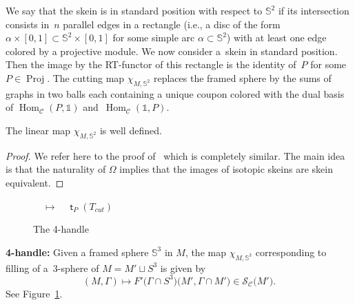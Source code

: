 \documentclass[pdftex]{sigma}
\numberwithin{equation}{section}
\newcommand{\Proj}{\operatorname{Proj}}
\numberwithin{theorem}{section}
\numberwithin{proposition}{section}
\numberwithin{definition}{section}
\numberwithin{lemma}{section}
\numberwithin{corollary}{section}
\numberwithin{remark}{section}
\numberwithin{example}{section}
\newcommand{\cat}{\mathcal{C}}
\newcommand{\Hom}{\operatorname{Hom}}
\newcommand{\unit}{\ensuremath{\mathds{1}}}
\newcommand{\mt}{{\operatorname{\mathsf{t}}}}
\newcommand{\TSkein}{{\mathscr{S}}}
\newcommand{\Sp}{\mathbb{S}}
\begin{document}
We say that the skein is in standard position with respect to $\Sp^2$ if its
intersection consists in~$n$ parallel edges in a rectangle \big(i.e., a disc of the form $\alpha\times [0,1]\subset \Sp^2\times [0,1]$ for some simple arc $\alpha\subset \Sp^2$\big) with at
least one edge colored by a projective module. We
now consider a~skein in standard position. Then the image by the
RT-functor of this rectangle is the identity of~$P$ for some
$P\in\Proj$. The cutting map $\chi_{M,\Sp^2}$ replaces the framed
sphere by the sums of graphs in two balls each containing a unique coupon
 colored with the dual basis of $\Hom_\cat(P,\unit)$ and~$\Hom_\cat(\unit,P)$.
\begin{proposition}
 The linear map $\chi_{M,\Sp^2}$ is well defined.
\end{proposition}
\begin{proof}
 We refer here to the proof of~\cite[Lemma 3.3]{CGPV2023a}
 which is completely similar. The main idea is that the naturality of
 $\Omega$ implies that the images of isotopic skeins are skein
 equivalent.
\end{proof}

\begin{figure}[t]
 \centering
{} $\quad \mapsto \quad \mt_P(T_{cut})$
\caption{The 4-handle}
 \label{fig:4handle}
\end{figure}
\textbf{4-handle:} Given a framed sphere $\Sp^3$ in $M$, the map $\chi_{M,\Sp^3}$ corresponding to
filling of a~3-sphere of $M=M'\sqcup S^3$ is given by
\[(M,\Gamma)\mapsto F'\bigl(\Gamma\cap S^3\bigr)\bigl(M',\Gamma\cap M'\bigr)\in\TSkein_\cat\bigl(M'\bigr).\]
See Figure~\ref{fig:4handle}.
\end{document}
